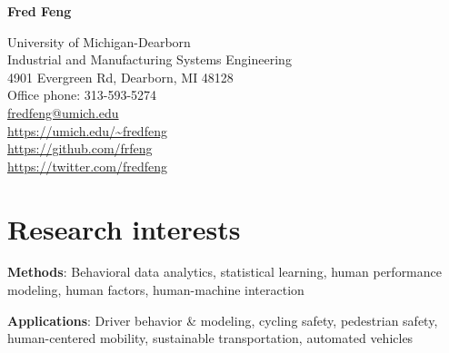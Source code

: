 \documentclass[11pt]{article}
\title{\vspace{-6em}}   %
\author{}
\date{}
\newenvironment{main}
{\begin{adjustwidth}{3em}{}}
{\end{adjustwidth}}
\begin{document}
\maketitle

\begin{multicols}{2}

{\selectfont\Huge\textbf{Fred Feng}}  %

\hfill\break
\hfill\break
\hfill\break
\hfill\break

\begin{flushright}
{
University of Michigan-Dearborn\\
Industrial and Manufacturing Systems Engineering\\
4901 Evergreen Rd, Dearborn, MI 48128\\
Office phone: 313-593-5274\\
\href{mailto:fredfeng@umich.edu}{fredfeng@umich.edu}\\
\url{https://umich.edu/~fredfeng}\\
\url{https://github.com/frfeng}\\
\url{https://twitter.com/fredfeng}\\
}
\end{flushright}
\end{multicols}

\vspace{-6ex}
\noindent\makebox[\linewidth]{\rule{\textwidth}{0.8pt}}

\section*{Research interests}
\begin{main}

\textbf{Methods}:
Behavioral data analytics,
statistical learning,
human performance modeling,
human factors,
human-machine interaction

\textbf{Applications}:
Driver behavior \& modeling,
cycling safety,
pedestrian safety,
human-centered mobility,
sustainable transportation,
automated vehicles

\end{main}
\end{document}
